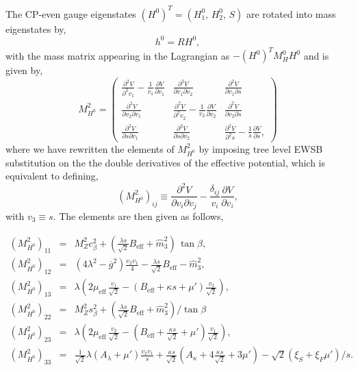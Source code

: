 \documentclass[final,3p,times,pdflatex]{elsarticle}
\newcommand{\be}{\begin{equation}}
\newcommand{\ee}{\end{equation}}
\newcommand{\ba}{\begin{eqnarray}}
\newcommand{\ea}{\end{eqnarray}}
\newcommand{\ds}{\displaystyle}
\begin{document}
The CP-even gauge eigenstates $(H^0)^T = (H_1^0,\, H_2^0, \, S)$ are rotated into mass eigenstates by,
\be h^0 = R H^0, \ee with the mass matrix appearing in the Lagrangian as  $-(H^0)^T M_H^0 H^0$ and is given by,
\be
M_{H^0}^2=
\left(
\begin{array}{ccc}
\ds\frac{\partial^2 V}{\partial^2 v_1 } - \ds\frac{1}{v_1}\frac{\partial V}{\partial v_1}&
\ds\frac{\partial^2 V}{\partial v_1 \partial v_2}&
\ds\frac{\partial^2 V}{\partial v_1 \partial s}\\[0.3cm]
\ds\frac{\partial^2 V}{\partial v_2 \partial v_1}&
\ds\frac{\partial^2 V}{\partial^2 v_2} - \ds\frac{1}{v_2}\frac{\partial V}{\partial v_2}&
\ds\frac{\partial^2 V}{\partial v_2 \partial s}\\[0.3cm]
\ds\frac{\partial^2 V}{\partial s \partial v_1}&
\ds\frac{\partial^2 V}{\partial s \partial v_2}&
\ds\frac{\partial^2 V}{\partial^2 s} - \ds\frac{1}{s}\frac{\partial V}{\partial s},
\end{array} 
\right)
 \ee where we have rewritten the elements of $M_{H^0}^2$ by imposing tree level EWSB substitution on the the double derivatives of the effective potential, which is equivalent to defining,  \be(M_{H^0}^2)_{ij} \equiv  \ds\frac{\partial^2 V}{\partial v_i \partial v_j} - \ds\frac{\delta_{ij}}{v_i}\ds\frac{\partial V}{\partial v_i}, \ee with $v_3 \equiv s$.  The elements are then given as follows,   

\ba
 (M_{H^0}^2)_{11} & = & M_Z^2 c_\beta^2 + (\ds\frac{\lambda s}{\sqrt{2}} B_\textrm{eff} +
\widehat{m}_3^2)\,\tan\beta,\\
 (M_{H^0}^2)_{12} & = & (4\lambda^2 - \overline{g}^2) \ds\frac{v_2 v_1 }{4}- 
\ds\frac{\lambda s}{\sqrt{2}} B_\textrm{eff} - \widehat{m}_3^2, \\ 
 (M_{H^0}^2)_{13} & = & \lambda (2 \mu_\textrm{eff}\,\ds\frac{ v_1}{\sqrt{2}} -
(B_\textrm{eff} + \kappa s + \mu')\ds\frac{ v_2}{\sqrt{2}}),\\
 (M_{H^0}^2)_{22} & = & M_Z^2 s_\beta^2 + (\ds\frac{\lambda s}{\sqrt{2}} B_\textrm{eff} +
\widehat{m}_3^2)/\tan\beta\, \\
 (M_{H^0}^2)_{23} & = & \lambda (2 \mu_\textrm{eff}\, \ds\frac{ v_2}{\sqrt{2}} -
(B_\textrm{eff} + \frac{\kappa s}{\sqrt{2}} + \mu')\ds\frac{ v_1}{\sqrt{2}}), \\
 (M_{H^0}^2)_{33} & = & \ds\frac{1}{\sqrt{2}}\lambda (A_\lambda + \mu') \frac{v_2 v_1}{s}
+ \frac{\kappa s}{\sqrt{2}} (A_\kappa + 4\frac{\kappa s}{\sqrt{2}}+ 3 \mu') - \sqrt{2}(\xi_S + \xi_F \mu')/s.
\label{eq:MH0}
\ea
\end{document}
